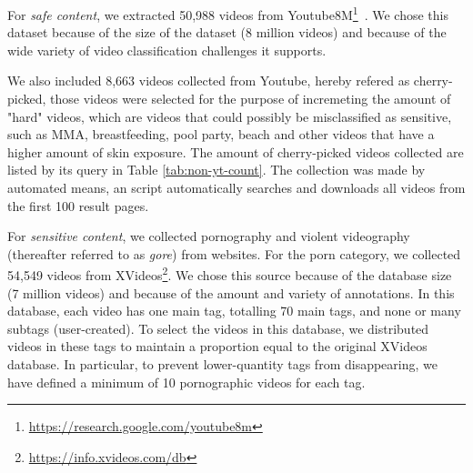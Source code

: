 For \textit{safe content}, we extracted 50,988 videos from Youtube8M\footnote{\url{https://research.google.com/youtube8m}}~\cite{abu2016youtube}. We chose this dataset because of the size of the dataset (8 million videos) and because of the wide variety of video classification challenges it supports.

We also included 8,663 videos collected from Youtube, hereby refered as cherry-picked, those videos were selected for the purpose of incremeting the amount of "hard" videos, which are videos that could possibly be misclassified as sensitive, such as MMA, breastfeeding, pool party, beach and other videos that have a higher amount of skin exposure. The amount of cherry-picked videos collected are listed by its query in Table \ref{tab:non-yt-count}. The collection was made by automated means, an script automatically searches and downloads all videos from the first 100 result pages.



For \textit{sensitive content}, we collected pornography and violent videography (thereafter referred to as \textit{gore}) from websites. For the porn category, we collected 54,549 videos from XVideos\footnote{\url{https://info.xvideos.com/db}}. We chose this source because of the database size (7 million videos) and because of the amount and variety of annotations. In this database, each video has one main tag, totalling 70 main tags, and none or many subtags (user-created). To select the videos in this database, we distributed videos in these tags to maintain a proportion equal to the original XVideos database. In particular, to prevent lower-quantity tags from disappearing, we have defined a minimum of 10 pornographic videos for each tag. 

